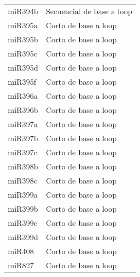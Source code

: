 \begin{table}[htbp!]
\begin{tabular}{ll}
miR394b        & Secuencial de base a loop \\
miR395a        & Corto de base a loop      \\
miR395b        & Corto de base a loop      \\
miR395c        & Corto de base a loop      \\
miR395d        & Corto de base a loop      \\
miR395f        & Corto de base a loop      \\
miR396a        & Corto de base a loop      \\
miR396b        & Corto de base a loop      \\
miR397a        & Corto de base a loop      \\
miR397b        & Corto de base a loop      \\
miR397c        & Corto de base a loop      \\
miR398b        & Corto de base a loop      \\
miR398c        & Corto de base a loop      \\
miR399a        & Corto de base a loop      \\
miR399b        & Corto de base a loop      \\
miR399c        & Corto de base a loop      \\
miR399d        & Corto de base a loop      \\
miR408         & Corto de base a loop      \\
miR827         & Corto de base a loop     
\end{tabular}
\end{table}
